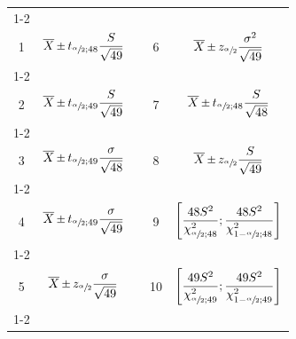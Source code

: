 \begin{questions}
\begin{center}
\begin{tabular}{|c|c|c|c|c|}
	\cline{1-2}\cline{4-5}
	&&&&\\[-3mm]
	1 &  $\displaystyle \overline {X}\Mypm t_{\sfrac{\alpha}{2};48}\frac{S}{\sqrt{49}}$
	 & \hspace{0.3cm} &
	 6 &  $\displaystyle \overline {X}\Mypm z_{\sfrac{\alpha}{2}}\frac{\sigma^2}{\sqrt{49}}$
	\\[4mm]
	\cline{1-2}\cline{4-5}
	&&&&\\[-3mm]
	 2 & $\displaystyle \overline {X}\Mypm t_{\sfrac{\alpha}{2};49}\frac{S}{\sqrt{49}}$
	&  &
	 7 & $\displaystyle \overline {X}\Mypm t_{\sfrac{\alpha}{2};48}\frac{S}{\sqrt{48}}$ 
	\\[4mm]
	\cline{1-2}\cline{4-5}
	&&&&\\[-3mm]
	 3 & $\displaystyle \overline {X}\Mypm t_{\sfrac{\alpha}{2};49}\frac{\sigma}{\sqrt{48}}$
	 &  &
	  8 & $\displaystyle \overline {X}\Mypm z_{\sfrac{\alpha}{2}}\frac{S}{\sqrt{49}}$
	 \\[4mm]
	 \cline{1-2}\cline{4-5}
	 &&&&\\[-3mm]
	   4 & $\displaystyle \overline {X}\Mypm t_{\sfrac{\alpha}{2};49}\frac{\sigma}{\sqrt{49}}$
	 &  &
	  9 & $\displaystyle \left[\frac{48S^2}{\chi_{\sfrac{\alpha}{2};48}^2};\frac{48S^2}{\chi_{1-\sfrac{\alpha}{2};48}^2}\right]$
	 \\[5mm]
	 \cline{1-2}\cline{4-5}
	 &&&&\\[-3mm]
	  5 & $\displaystyle \overline {X}\Mypm z_{\sfrac{\alpha}{2}}\frac{\sigma}{\sqrt{49}}$
	 &  &
	  10 & $\displaystyle \left[\frac{49S^2}{\chi_{\sfrac{\alpha}{2};49}^2};\frac{49S^2}{\chi_{1-\sfrac{\alpha}{2};49}^2}\right]$
	 \\[5mm]
	 \cline{1-2}\cline{4-5}

	
\end{tabular}

\end{center}


\end{questions}
